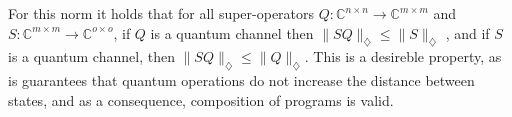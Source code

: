 
For this norm it holds that for all super-operators $Q: \mathbb{C}^{n \times n}\rightarrow \mathbb{C}^{m \times m} $ and $S:\mathbb{C}^{m \times m} \rightarrow \mathbb{C}^{o \times o} $, if $Q$ is a quantum channel then $\lVert S  Q \rVert_{\diamondsuit} \leq \lVert S \rVert_{\diamondsuit}$ \cite[Proposition 3.44 and Proposition 3.48]{watrous2018theory}, and if $S$ is a quantum channel, then $\lVert S  Q \rVert_{\diamondsuit} \leq \lVert Q \rVert_{\diamondsuit}$. This is a desireble property, as is guarantees that quantum operations do not increase the distance between states, and as a
consequence, composition of programs is valid.




